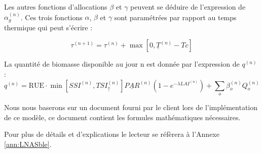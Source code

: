 Les autres fonctions d'allocations $\beta$ et $\gamma$   peuvent se déduire de l'expression de $\alpha_g^{(n)}$.
Ces trois fonctions $\alpha$, $\beta$ et $\gamma$ sont paramétrées par rapport au temps thermique qui peut s'écrire :

\[ {\tau}^{(n+1)}=\tau^{(n)}+\max[0,\underline{T}^{(n)}-Tc] \]

La quantité de biomasse disponible au jour n est donnée par l'expression de $q^{(n)}$ :
\[ 
{q^{(n)}} = \text{RUE}\cdot \min[SSI^{(n)}, TSI_\uparrow^{(n)}]\underline{PAR}^{(n)}(1-e^{-\lambda LAI^{(n)}})+\sum_o \beta_o^{(n)}Q_o^{(n)} 
\]

Nous nous baserons sur un document fourni par le client lors de l'implémentation de ce modèle, ce document contient les formules mathématiques nécessaires.

Pour plus de détails et d'explications le lecteur se réfèrera à l'Annexe \ref{ann:LNASble}.
